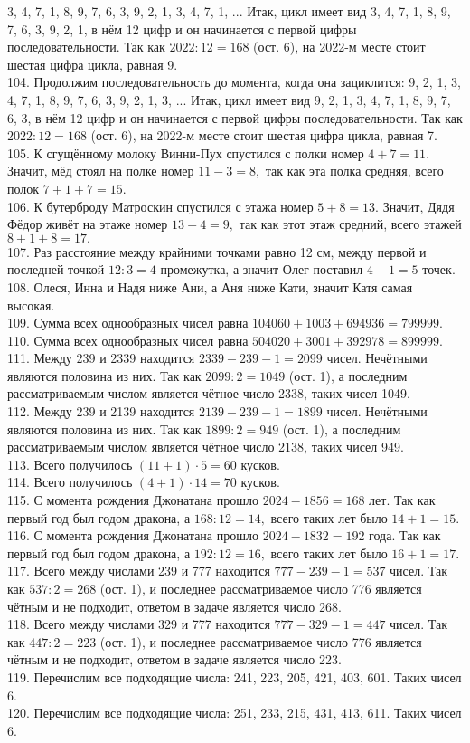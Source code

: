 3, 4, 7, 1, 8, 9, 7, 6, 3, 9, 2, 1, 3, 4, 7, 1, ... Итак, цикл имеет вид
3, 4, 7, 1, 8, 9, 7, 6, 3, 9, 2, 1, в нём 12 цифр и он начинается с первой цифры последовательности. Так как $2022:12=168$ (ост. 6), на 2022-м месте стоит шестая цифра цикла, равная 9.\\
104. Продолжим последовательность до момента, когда она зациклится:
9, 2, 1, 3, 4, 7, 1, 8, 9, 7, 6, 3, 9, 2, 1, 3, ... Итак, цикл имеет вид
9, 2, 1, 3, 4, 7, 1, 8, 9, 7, 6, 3, в нём 12 цифр и он начинается с первой цифры последовательности. Так как $2022:12=168$ (ост. 6), на 2022-м месте стоит шестая цифра цикла, равная 7.\\
105. К сгущённому молоку Винни-Пух спустился с полки номер $4+7=11.$ Значит, мёд стоял на полке номер $11-3=8,$ так как эта полка средняя, всего полок $7+1+7=15.$\\
106. К бутерброду Матроскин спустился с этажа номер $5+8=13.$ Значит, Дядя Фёдор живёт на этаже номер $13-4=9,$ так как этот этаж средний, всего этажей $8+1+8=17.$\\
107. Раз расстояние между крайними точками равно 12 см, между первой и последней точкой $12:3=4$ промежутка, а значит Олег поставил $4+1=5$ точек.\\
108. Олеся, Инна и Надя ниже Ани, а Аня ниже Кати, значит Катя самая высокая.\\
109. Сумма всех однообразных чисел равна $104060+1003+694936=799999.$\\
110. Сумма всех однообразных чисел равна $504020+3001+392978=899999.$\\
111. Между 239 и 2339 находится $2339-239-1=2099$ чисел. Нечётными являются половина из них. Так как $2099:2=1049$ (ост. 1), а последним рассматриваемым числом является чётное число 2338, таких чисел 1049.\\
112. Между 239 и 2139 находится $2139-239-1=1899$ чисел. Нечётными являются половина из них. Так как $1899:2=949$ (ост. 1), а последним рассматриваемым числом является чётное число 2138, таких чисел 949.\\
113. Всего получилось $(11+1)\cdot5=60$ кусков.\\
114. Всего получилось $(4+1)\cdot14=70$ кусков.\\
115. С момента рождения Джонатана прошло $2024-1856=168$ лет. Так как первый год был годом дракона, а $168:12=14,$  всего таких лет было $14+1=15.$\\
116. С момента рождения Джонатана прошло $2024-1832=192$ года. Так как первый год был годом дракона, а $192:12=16,$  всего таких лет было $16+1=17.$\\
117. Всего между числами 239 и 777 находится $777-239-1=537$ чисел. Так как $537:2=268$ (ост. 1), и последнее рассматриваемое число 776 является чётным и не подходит, ответом в задаче является число 268.\\
118. Всего между числами 329 и 777 находится $777-329-1=447$ чисел. Так как $447:2=223$ (ост. 1), и последнее рассматриваемое число 776 является чётным и не подходит, ответом в задаче является число 223.\\
119. Перечислим все подходящие числа: 241, 223, 205, 421, 403, 601. Таких чисел 6.\\
120. Перечислим все подходящие числа: 251, 233, 215, 431, 413, 611. Таких чисел 6.
\newpage
